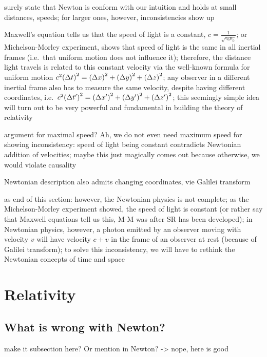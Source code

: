 surely state that Newton is conform with our intuition and holds at small distances, speeds; for larger ones, however, inconsistencies show up



Maxwell's equation tells us that the speed of light is a constant, $c = \frac{1}{\sqrt{\epsilon_0 \mu_0}}$; or Michelson-Morley experiment, shows that speed of light is the same in all inertial frames (i.e.~that uniform motion does not influence it); therefore, the distance light travels is related to this constant velocity via the well-known formula for uniform motion $c^2 \qty(\Delta t)^2 = \qty(\Delta x)^2 + \qty(\Delta y)^2 + \qty(\Delta z)^2$; any observer in a different inertial frame also has to measure the same velocity, despite having different coordinates, i.e.~$c^2 \qty(\Delta t')^2 = \qty(\Delta x')^2 + \qty(\Delta y')^2 + \qty(\Delta z')^2$; this seemingly simple idea will turn out to be very powerful and fundamental in building the theory of relativity

argument for maximal speed? Ah, we do not even need maximum speed for showing inconsistency: speed of light being constant contradicts Newtonian addition of velocities; maybe this just magically comes out because otherwise, we would violate causality


Newtonian description also admits changing coordinates, vie Galilei transform



as end of this section: however, the Newtonian physics is not complete; as the Michelson-Morley experiment showed, the speed of light is constant (or rather say that Maxwell equations tell us this, M-M was after SR has been developed); in Newtonian physics, however, a photon emitted by an observer moving with velocity $v$ will have velocity $c + v$ in the frame of an observer at rest (because of Galilei transform); to solve this inconsistency, we will have to rethink the Newtonian concepts of time and space



\newpage



	\section{Relativity}
		\subsection{What is wrong with Newton?}
make it subsection here? Or mention in Newton? -> nope, here is good



